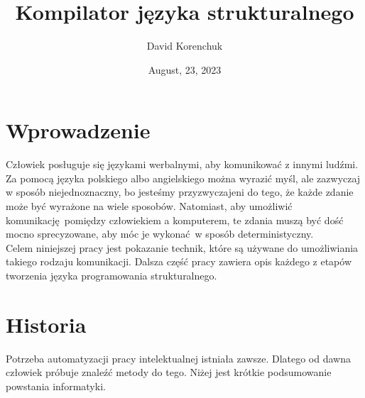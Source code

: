 \documentclass[leqno, 12pt]{article}
\title{Kompilator języka strukturalnego}
\author{David Korenchuk}
\date{August, 23, 2023}
\begin{document}
    \pagestyle{fancy}
    \lhead{\leftmark}
    \rhead{\thetitle}
    
    \setlength{\parindent}{0pt}

    \maketitle
	
	
	\section{Wprowadzenie}
	
		Człowiek posługuje się językami werbalnymi, aby komunikować z innymi ludźmi. Za pomocą
		języka polskiego albo angielskiego można wyrazić myśl, ale zazwyczaj w sposób niejednoznaczny,
		bo jesteśmy przyzwyczajeni do tego, że każde zdanie może być wyrażone na wiele sposobów. Natomiast,
		aby umożliwić komunikację pomiędzy człowiekiem a komputerem, te zdania muszą być dość mocno
		sprecyzowane, aby móc je wykonać w sposób deterministyczny.
		\\
		
		Celem niniejszej pracy jest pokazanie technik, które są używane do umożliwiania takiego rodzaju
		komunikacji. Dalsza część pracy zawiera opis każdego z etapów tworzenia języka programowania
		strukturalnego. 
	
	\section{Historia}
		
		Potrzeba automatyzacji pracy intelektualnej istniała zawsze. Dlatego od dawna człowiek próbuje
		znaleźć metody do tego. Niżej jest krótkie podsumowanie powstania informatyki.
		\\
\end{document}
